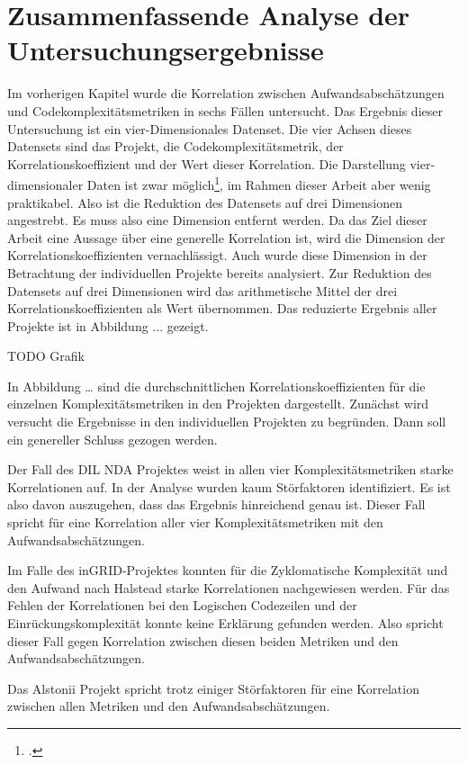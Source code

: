 \chapter{Zusammenfassende Analyse der Untersuchungsergebnisse}\label{zusammenfassende-analyse-der-untersuchungsergebnisse}

Im vorherigen Kapitel wurde die Korrelation zwischen
Aufwandsabschätzungen und Codekomplexitätsmetriken in sechs Fällen
untersucht. Das Ergebnis dieser Untersuchung ist ein vier-Dimensionales
Datenset. Die vier Achsen dieses Datensets sind das Projekt, die
Codekomplexitätsmetrik, der Korrelationskoeffizient und der Wert dieser
Korrelation. Die Darstellung vier-dimensionaler Daten ist zwar
möglich\footcite{sarkarArtEffectiveVisualization2021}, im Rahmen dieser
Arbeit aber wenig praktikabel. Also ist die Reduktion des Datensets auf
drei Dimensionen angestrebt. Es muss also eine Dimension entfernt
werden. Da das Ziel dieser Arbeit eine Aussage über eine generelle
Korrelation ist, wird die Dimension der Korrelationskoeffizienten
vernachlässigt. Auch wurde diese Dimension in der Betrachtung der
individuellen Projekte bereits analysiert. Zur Reduktion des Datensets
auf drei Dimensionen wird das arithmetische Mittel der drei
Korrelationskoeffizienten als Wert übernommen. Das reduzierte Ergebnis
aller Projekte ist in Abbildung ... gezeigt.

TODO Grafik

In Abbildung \ldots{} sind die durchschnittlichen
Korrelationskoeffizienten für die einzelnen Komplexitätsmetriken in den
Projekten dargestellt. Zunächst wird versucht die Ergebnisse in den
individuellen Projekten zu begründen. Dann soll ein genereller Schluss
gezogen werden.

Der Fall des DIL NDA Projektes weist in allen vier Komplexitätsmetriken
starke Korrelationen auf. In der Analyse wurden kaum Störfaktoren
identifiziert. Es ist also davon auszugehen, dass das Ergebnis
hinreichend genau ist. Dieser Fall spricht für eine Korrelation aller
vier Komplexitätsmetriken mit den Aufwandsabschätzungen.

Im Falle des inGRID-Projektes konnten für die Zyklomatische Komplexität
und den Aufwand nach Halstead starke Korrelationen nachgewiesen werden.
Für das Fehlen der Korrelationen bei den Logischen Codezeilen und der
Einrückungskomplexität konnte keine Erklärung gefunden werden. Also
spricht dieser Fall gegen Korrelation zwischen diesen beiden Metriken
und den Aufwandsabschätzungen.

Das Alstonii Projekt spricht trotz einiger Störfaktoren für eine Korrelation
zwischen allen Metriken und den Aufwandsabschätzungen.

